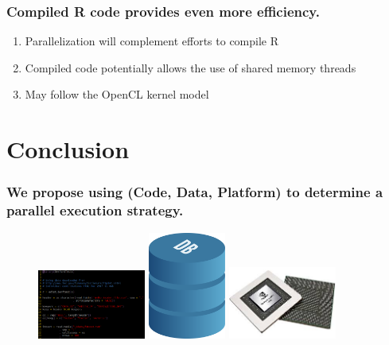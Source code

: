 \documentclass{beamer}
\begin{document}
\begin{frame}

    \frametitle{Compiled R code provides even more efficiency.}

\begin{enumerate}
    \item Parallelization will complement efforts to compile R
    \item Compiled code potentially allows the use of shared memory threads
    \item May follow the OpenCL kernel model
\end{enumerate}

\end{frame}
\section{Conclusion}
\begin{frame}

%
%
%

    \frametitle{We propose using (Code, Data, Platform) to determine a
    parallel execution strategy.}

\begin{figure}
            \includegraphics[width=1.4in]{code_screen.png}
            \hfill
            \includegraphics[width=1in]{database.png}
            \hfill
            \includegraphics[width=1.4in]{gpu.jpg}
\end{figure}

\end{frame}
\end{document}
